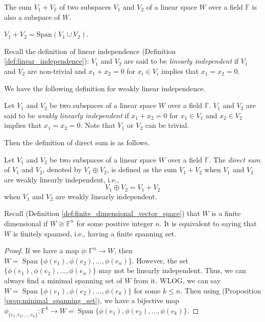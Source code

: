 \documentclass[
	11pt, %
	fleqn, %
	a4paper, %
]{LegrandOrangeBook}
\renewcommand{\span}[1]{\text{Span}(#1)} %
\newcommand{\F}{\mathbb{F}} %
\DeclareMathOperator{\Span}{Span}
\begin{document}
\begin{proposition}
    The sum $V_1 + V_2$ of two subspaces $V_1$ and $V_2$ of a linear space $W$ over a field $\F$ is also a subspace of $W$.
\end{proposition}

\begin{proposition}
    $V_1 + V_2 = \span{V_1 \cup V_2}$.
\end{proposition}

Recall the definition of linear independence (Definition \ref{def:linear_independence}): $V_1$ and $V_2$ are said to be \emph{linearly independent} if $V_1$ and $V_2$ are non-trivial and $x_1 + x_2 = 0$ for $x_i \in V_i$ implies that $x_1 = x_2 = 0$.

We have the following definition for weakly linear independence.
\begin{definition}
    Let $V_1$ and $V_2$ be two subspaces of a linear space $W$ over a field $\F$. $V_1$ and $V_2$ are said to be \emph{weakly linearly independent} if $x_1 + x_2 = 0$ for $x_1 \in V_1$ and $x_2 \in V_2$ implies that $x_1 = x_2 = 0$. Note that $V_1$ or $V_2$ can be trivial.
\end{definition}

Then the definition of direct sum is as follows.
\begin{definition}
    Let $V_1$ and $V_2$ be two subspaces of a linear space $W$ over a field $\F$. The \emph{direct sum} of $V_1$ and $V_2$, denoted by $V_1 \oplus V_2$, is defined as the sum $V_1 + V_2$ when $V_1$ and $V_2$ are weakly linearly independent, i.e.,
    \[
        V_1 \oplus V_2 = V_1 + V_2
    \]
    when $V_1$ and $V_2$ are weakly linearly independent.    
\end{definition}

Recall (Definition \ref{def:finite_dimensional_vector_space}) that $W$ is a finite dimensional if $W \cong \F^n$ for some positive integer $n$. It is equivalent to saying that $W$ is finitely spanned, i.e., having a finite spanning set.

\begin{proof}
    If we have a map $\phi : \F^n \to W$, then $W = \Span\{\phi(e_1), \phi(e_2), \ldots, \phi(e_n)\}$. However, the set $\{\phi(e_1), \phi(e_2), \ldots, \phi(e_n)\}$ may not be linearly independent. Thus, we can always find a minimal spanning set of $W$ from it. WLOG, we can say $W = \Span\{\phi(e_1), \phi(e_2), \ldots, \phi(e_k)\}$ for some $k \leq n$. Then using (Proposition \ref{prop:minimal_spanning_set}), we have a bijective map $\phi_{\{e_1, e_2, \ldots, e_k\}} : \F^k \to W = \Span\{\phi(e_1), \phi(e_2), \ldots, \phi(e_k)\}$.
\end{proof}
\end{document}

